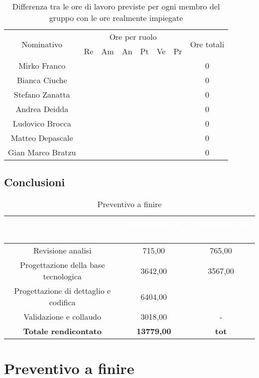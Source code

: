 \begin{flushleft}
\begin{table}[!h]
\begin{center}
\begin{tabularx}{\textwidth}{|c|cccccc|c|}
				\hline
				\multirow{2}{*}{Nominativo} & \multicolumn{6}{c|}{Ore per ruolo} & \multirow{2}{*}{Ore totali} \\ \cline{2-7}
				& Re & Am & An & Pt & Ve & Pr &      \\ \hline
				\endhead
				Mirko Franco       &   &  &   &   &  &   & 0        \\ \hline
				Bianca Ciuche      &   &  &   &   &  &   & 0        \\ \hline
				Stefano Zanatta    &   &  &   &	  &  &   & 0        \\ \hline
				Andrea Deidda      &   &  &   &   &  &   & 0  		\\ \hline
				Ludovico Brocca    &   &  &   &   &  &   & 0        \\ \hline
				Matteo Depascale   &   &  &   &   &  &	 & 0  		\\ \hline
				Gian Marco Bratzu  &   &  &   &   &  &   & 0        \\ \hline
				
			\end{tabularx}
			\caption{Differenza tra le ore di lavoro previste per ogni membro del gruppo con le ore realmente impiegate }
		\end{center}
	\end{table}

	\subsection{Conclusioni}
		\begin{table}[!h]
		\begin{center}
			
			
			\begin{tabular}{ccc}
				
				\rowcolor{coolblack}
				\hline
				\textcolor{white}{Periodo} & \textcolor{white}{Preventivo in \euro} & \textcolor{white}{Consuntivo in \euro}\\
				\hline
				Revisione analisi& 715,00 & 765,00 \\ 	
				Progettazione della base tecnologica& 3642,00 & 3567,00\\ 
				Progettazione di dettaglio e codifica& 6404,00   &\\ 
				Validazione e collaudo & 3018,00 & - \\ \hline
				\textbf{Totale rendicontato}& \textbf{13779,00} & \textbf{tot}	\\ \hline   
				
			\end{tabular}
			\caption{Preventivo a finire} 
		\end{center}		
	\end{table}

\section{Preventivo a finire}




\end{flushleft}
